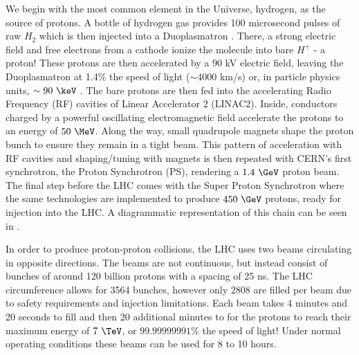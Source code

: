 We begin with the most common element in the Universe, hydrogen, as the source
of protons.  A bottle of hydrogen gas provides 100 microsecond pulses of raw
$H_{2}$ which is then injected into a Duoplasmatron \cite{Scrivens:1382102}.
There,  a strong electric field and free electrons from a cathode ionize the
molecule into bare $H^{+}$ - a proton!  These protons are then accelerated by
a 90 kV electric field, leaving the Duoplasmatron at 1.4\% the speed of light
($\sim$4000 km/s) or, in particle physics units, $\sim 90~\keV$
\cite{duoplasmatron_doc}. The bare protons are then fed into the accelerating
Radio Frequency (RF) cavities of Linear Accelerator 2 (LINAC2).  Inside,
conductors charged by a powerful oscillating electromagnetic field accelerate
the protons to an energy of $50~\MeV$. Along the way, small quadrupole magnets
shape the proton bunch to ensure they remain in a tight beam.  This pattern of
acceleration with RF cavities and shaping/tuning with magnets is then repeated
with CERN's first synchrotron, the Proton Synchrotron (PS), rendering a $1.4~\GeV$
proton beam.  The final step before the LHC comes with the Super Proton
Synchrotron where the same technologies are implemented to produce $450~\GeV$
protons, ready for injection into the LHC. A diagrammatic representation of
this chain can be seen in . 

In order to produce proton-proton collisions, the LHC uses two beams
circulating in opposite directions.  The beams are not continuous, but instead
consist of bunches of around 120 billion protons with a spacing of 25 ns.
The LHC circumference allows for 3564 bunches, however only 2808 are
filled per beam due to safety requirements and injection limitations.  Each
beam takes 4 minutes and 20 seconds to fill and then 20 additional minutes
to for the protons to reach their maximum energy of $7~\TeV$, or
$99.99999991\%$ the speed of light! Under normal operating conditions these
beams can be used for 8 to 10 hours.
